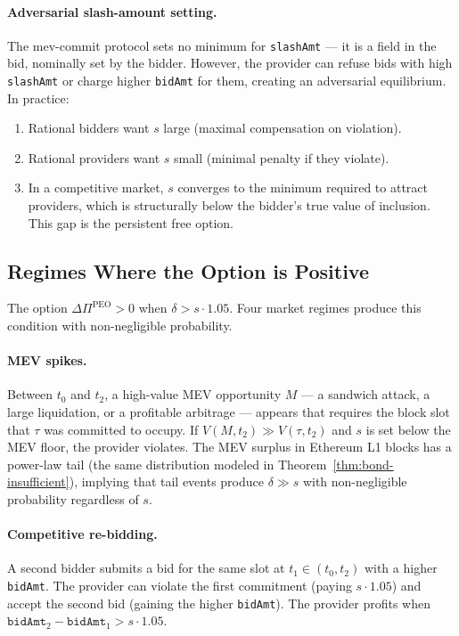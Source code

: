 \paragraph{Adversarial slash-amount setting.}
The mev-commit protocol sets no minimum for \texttt{slashAmt} --- it is a
field in the bid, nominally set by the bidder. However, the provider can
refuse bids with high \texttt{slashAmt} or charge higher \texttt{bidAmt}
for them, creating an adversarial equilibrium. In practice:
\begin{enumerate}
  \item Rational bidders want $s$ large (maximal compensation on violation).
  \item Rational providers want $s$ small (minimal penalty if they violate).
  \item In a competitive market, $s$ converges to the minimum required to
    attract providers, which is structurally below the bidder's true value
    of inclusion. This gap is the persistent free option.
\end{enumerate}

\subsection{Regimes Where the Option is Positive}
\label{sec:peo-regimes}

The option $\Delta\Pi^{\mathrm{PEO}} > 0$ when $\delta > s \cdot 1.05$.
Four market regimes produce this condition with non-negligible probability.

\paragraph{MEV spikes.}
Between $t_0$ and $t_2$, a high-value MEV opportunity $M$ --- a sandwich
attack, a large liquidation, or a profitable arbitrage --- appears that
requires the block slot that $\tau$ was committed to occupy.
If $V(M, t_2) \gg V(\tau, t_2)$ and $s$ is set below the MEV floor,
the provider violates. The MEV surplus in Ethereum L1 blocks has a
power-law tail (the same distribution modeled in
Theorem~\ref{thm:bond-insufficient}), implying that tail events produce
$\delta \gg s$ with non-negligible probability regardless of $s$.

\paragraph{Competitive re-bidding.}
A second bidder submits a bid for the same slot at $t_1 \in (t_0, t_2)$
with a higher \texttt{bidAmt}. The provider can violate the first commitment
(paying $s \cdot 1.05$) and accept the second bid (gaining the higher
\texttt{bidAmt}). The provider profits when
$\texttt{bidAmt}_2 - \texttt{bidAmt}_1 > s \cdot 1.05$.

